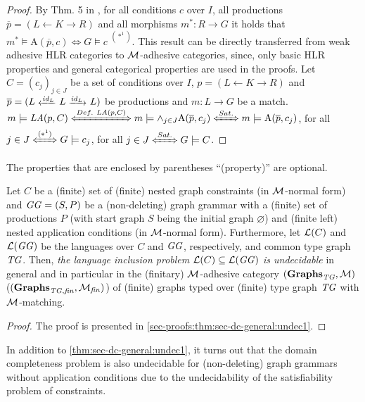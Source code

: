 \begin{proof}
By Thm. 5 in \cite{DBLP:journals/mscs/HabelP09}, for all conditions $c$ over $I$, all productions $\overline{p}=(L \gets K \to R)$ and all morphisms $m^*\colon R \to G$ it holds that $m^* \models \text{A}(\overline{p},c) \Leftrightarrow G \models c$ $^{(*^1)}$.
This result can be directly transferred from weak adhesive HLR categories to ${\cal M}$-adhesive categories, since, only basic HLR properties and general categorical properties are used in the proofs.
Let $C=(c_j)_{j \in J}$ be a set of conditions over $I$, $p=(L \gets K \to R)$ and $\overline{p}=(L \transB{\id_L} L \trans{\id_L} L)$ be productions and $m\colon L \to G$ be a match.
$m \models \LA(p,C) \xLeftrightarrow{Def.\ \LA(p,C)} m \models \wedge_{j \in J} \text{A}(\overline{p},c_j) \xLeftrightarrow{Sat.} m \models \text{A}(\overline{p},c_j)$, for all $j \in J \xLeftrightarrow{(*^1)} G \models c_j$, for all $j \in J \xLeftrightarrow{Sat.} G \models C$.
\end{proof}

The properties that are enclosed by parentheses ``(property)'' are optional.

\begin{theorem}
\label{thm:sec-dc-general:undec1}
Let $C$ be a (finite) set of (finite) nested graph constraints (in ${\cal M}$-normal form) and $\mathit{GG}=(S,P)$ be a (non-deleting) graph grammar with a (finite) set of productions $P$ (with start graph $S$ being the initial graph $\varnothing$) and (finite left) nested application conditions (in ${\cal M}$-normal form).
Furthermore, let $\mathcal{L}(C)$ and $\mathcal{L}(\mathit{GG})$ be the languages over $C$ and $\mathit{GG}$, respectively, and common type graph $\mathit{TG}$.
Then, \emph{the language inclusion problem $\mathcal{L}(C) \subseteq \mathcal{L}(\mathit{GG})$ is undecidable} in general and in particular in the (finitary) ${\cal M}$-adhesive category $(\mathbf{\mathbf{Graphs}_\mathit{TG},{\cal M}})$ ($(\mathbf{\mathbf{Graphs}_{\mathit{TG},\mathit{fin}},{\cal M}_\mathit{fin}})$) of (finite) graphs typed over (finite) type graph $\mathit{TG}$ with ${\cal M}$-matching.
\envEndMarker
\end{theorem}

\begin{proof}
The proof is presented in \cref{sec-proofs:thm:sec-dc-general:undec1}.
\end{proof}

In addition to \cref{thm:sec-dc-general:undec1}, it turns out that the domain completeness problem is also undecidable for (non-deleting) graph grammars without application conditions due to the undecidability of the satisfiability problem of constraints.

